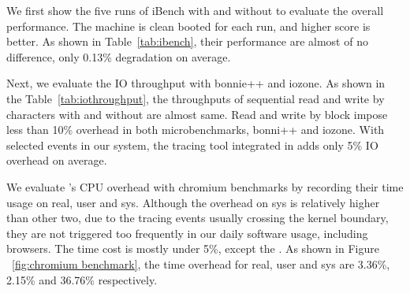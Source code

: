 
We first show the five runs of iBench with and without \xxx to evaluate the
overall performance. The machine is clean booted for each run, and higher
score is better. As shown in Table~\ref{tab:ibench}, their
performance are almost of no difference, only 0.13\% degradation on average.


Next, we evaluate the IO throughput with bonnie++ and iozone. As shown in the
Table~\ref{tab:iothroughput}, the throughputs of sequential read and write
by characters with and without \xxx are almost same. Read and write by block
impose less than 10\% overhead in  both microbenchmarks, bonni++ and iozone.
With selected events in our system, the tracing tool integrated in \xxx
adds only 5\% IO overhead on average.


We evaluate \xxx's CPU overhead with chromium benchmarks by recording their
time usage on real, user and sys. Although the overhead on sys is relatively
higher than other two, due to the tracing events usually crossing the
kernel boundary, they are not triggered too frequently in our daily software
usage, including browsers. The time cost is mostly under 5\%, except the
. As shown in Figure ~\ref{fig:chromium
benchmark}, the time overhead for real, user and sys are 3.36\%, 2.15\% and 36.76\%
respectively.
